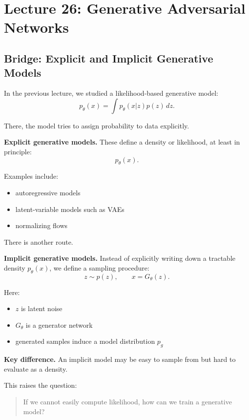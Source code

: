 \section{Lecture 26: Generative Adversarial Networks}

\subsection{Bridge: Explicit and Implicit Generative Models}

In the previous lecture, we studied a likelihood-based generative model:
\[
p_\theta(x)=\int p_\theta(x|z)p(z)\,dz.
\]

There, the model tries to assign probability to data explicitly.

\medskip

\noindent
\textbf{Explicit generative models.}
These define a density or likelihood, at least in principle:
\[
p_\theta(x).
\]

Examples include:
\begin{itemize}
    \item autoregressive models
    \item latent-variable models such as VAEs
    \item normalizing flows
\end{itemize}

\medskip

\noindent
There is another route.

\medskip

\noindent
\textbf{Implicit generative models.}
Instead of explicitly writing down a tractable density $p_\theta(x)$, we define a sampling procedure:
\[
z \sim p(z), \qquad x = G_\theta(z).
\]

Here:
\begin{itemize}
    \item $z$ is latent noise
    \item $G_\theta$ is a generator network
    \item generated samples induce a model distribution $p_g$
\end{itemize}

\medskip

\noindent
\textbf{Key difference.}
An implicit model may be easy to sample from but hard to evaluate as a density.

\medskip

\noindent
This raises the question:
\begin{quote}
If we cannot easily compute likelihood, how can we train a generative model?
\end{quote}

